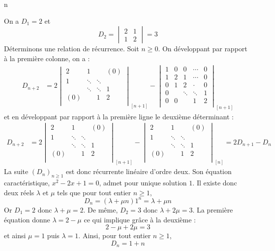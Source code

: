 n\documentclass[a4paper,10pt]{report}
\begin{document}
\corr On a $D_1=2$ et 
$$ D_2 = \begin{vmatrix}
2 & 1 \\
1 & 2 
\end{vmatrix} = 3$$
Déterminons une relation de récurrence. Soit $n \geq 0$. On développant par rapport à la première colonne, on a :
\begin{align*}
D_{n+2} & = 2  \begin{vmatrix}
        2 & 1 & {} & {(0)} \\
        1 & \ddots & \ddots & {} \\
        {} & \ddots & \ddots & 1 \\
        {(0)} & {} & 1 & 2 \\
    \end{vmatrix}_{[n+1]} -  \begin{vmatrix}
        1 & 0 & 0 & \cdots & 0 \\
        1 & 2 & 1 & \cdots & 0  \\
        0 & 1 & 2 & \cdot & 0 \\
        0 & &\ddots  & \ddots & 1 \\
        0 & 0 & & 1 & 2 \\
    \end{vmatrix}_{[n+1]}
\end{align*}
et en développant par rapport à la première ligne le deuxième déterminant :
\begin{align*}
D_{n+2} & = 2  \begin{vmatrix}
        2 & 1 & {} & {(0)} \\
        1 & \ddots & \ddots & {} \\
        {} & \ddots & \ddots & 1 \\
        {(0)} & {} & 1 & 2 \\
    \end{vmatrix}_{[n+1]} - \begin{vmatrix}
        2 & 1 & {} & {(0)} \\
        1 & \ddots & \ddots & {} \\
        {} & \ddots & \ddots & 1 \\
        {(0)} & {} & 1 & 2 \\
    \end{vmatrix}_{[n]}  = 2 D_{n+1} - D_n 
\end{align*}
La suite $(D_n)_{n \geq 1}$ est donc récurrente linéaire d'ordre deux. Son équation caractéristique, $x^2-2x+1=0$, admet pour unique solution $1$. Il existe donc deux réels $\lambda$ et $\mu$ tels que pour tout entier $n \geq 1$,
$$ D_n = (\lambda+ \mu n) 1^n = \lambda + \mu n$$
Or $D_1=2$ donc $\lambda+\mu =2$. De même, $D_2=3$ donc $\lambda+ 2 \mu = 3$. La première équation donne $\lambda = 2- \mu$ ce qui implique grâce à la deuxième :
$$  2- \mu + 2 \mu = 3$$
et ainsi $ \mu =1$ puis $\lambda=1$. Ainsi, pour tout entier $n \geq 1$,
$$ D_n = 1+n$$
\end{document}
